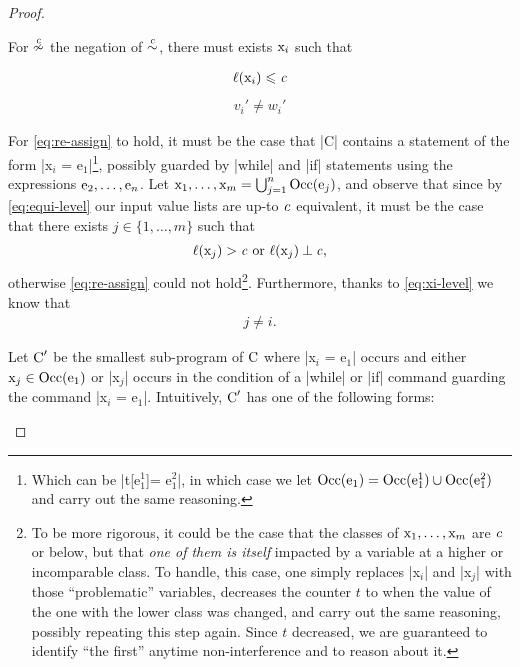 \begin{proof}
\begin{description}
For \(\nupce{\scl{c}}\) the negation of
\(\upce{\scl{c}}\), \ie there must exists
\ensuremath{\prc|x$_i$|} such that
\begin{multicols}{2}
\noindent
\begin{align}
\ell(\prc|x$_i$|) \leqslant \scl{c} \label{eq:xi-level}
\end{align}
\begin{align}
v_i' \neq w_i' \label{eq:re-assign}
\end{align}
\end{multicols}
For \autoref{eq:re-assign} to hold, it must be the case that \prc|C|
contains a statement of the form \prc|x$_i$ = e$_1$|\footnote{Which can be
\prc|t[e$_1^1$]= e$_1^2$|, in which case we let  \ensuremath{\Occ(\prc|e$_1$|) =
\Occ(\prc|e$_1^1$|) \cup \Occ(\prc|e$_1^2$|)} and carry out the same
reasoning.}, possibly guarded by \prc|while| and \prc|if| statements using the
expressions  \ensuremath{\prc|e$_2$|, \hdots, \prc|e$_n$|}. Let
\ensuremath{\prc|x$_1$|, \hdots, \prc|x$_m$| = \bigcup_{j=1}^n
\Occ(\prc|e$_j$|)}, and observe that since by
\autoref{eq:equi-level} our input value lists are up-to
\(\mathit{c}\) equivalent, it must be the case that there exists \(j
\in \{1, \hdots, m\}\) such that
\begin{align}
\ell(\prc|x$_j$|) > \scl{c} \text{ or } \ell(\prc|x$_j$|) \orth \scl{c} \text{,}
\label{eq:xj-level} \end{align}otherwise \autoref{eq:re-assign} could not
hold\footnote{To be more rigorous, it could be the case that the classes of
\ensuremath{\prc|x$_1$|, \hdots, \prc|x$_m$|} are $\mathit{c}$ or below, but that
\emph{one of them is itself} impacted by a variable at a higher or incomparable
class. To handle, this case, one simply replaces \prc|x$_i$| and \prc|x$_j$|
with those \enquote{problematic} variables, decreases the counter \(t\) to when
the value of the one with the lower class was changed, and carry out the same
reasoning, possibly repeating this step again. Since \(t\) decreased, we are
guaranteed to identify \enquote{the first} anytime
non-interference  and to reason
about it.}. Furthermore, thanks to \autoref{eq:xi-level} we know that
\begin{align}
j \neq i\text{.} \label{eq:i-not-j}
\end{align}

Let \(\prc|C|'\) be the smallest sub-program of
\(\prc|C|\) where \prc|x$_i$ = e$_1$| occurs and either
\ensuremath{\prc|x$_j$| \in \Occ(\prc|e$_1$|)} or \prc|x$_j$| occurs
in the condition of a \prc|while| or \prc|if| command guarding the command
\prc|x$_i$ = e$_1$|. Intuitively, \(\prc|C|'\) has one of the
following forms:
\vspace{.25em}


\end{description}
\end{proof}
